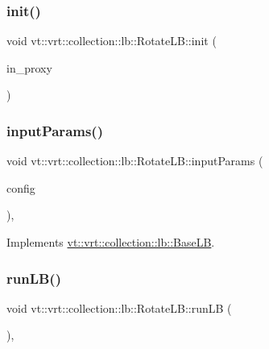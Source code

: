 \subsubsection{\texorpdfstring{init()}{init()}}
{\footnotesize\ttfamily void vt\+::vrt\+::collection\+::lb\+::\+Rotate\+L\+B\+::init (\begin{DoxyParamCaption}\item[{\hyperlink{structvt_1_1objgroup_1_1proxy_1_1_proxy}{objgroup\+::proxy\+::\+Proxy}$<$ \hyperlink{structvt_1_1vrt_1_1collection_1_1lb_1_1_rotate_l_b}{Rotate\+LB} $>$}]{in\+\_\+proxy }\end{DoxyParamCaption})}

\mbox{\label{structvt_1_1vrt_1_1collection_1_1lb_1_1_rotate_l_b_a39b5c8882b32f8a50be30cf2f3fd8fab}} 
\subsubsection{\texorpdfstring{input\+Params()}{inputParams()}}
{\footnotesize\ttfamily void vt\+::vrt\+::collection\+::lb\+::\+Rotate\+L\+B\+::input\+Params (\begin{DoxyParamCaption}\item[{\hyperlink{structvt_1_1vrt_1_1collection_1_1balance_1_1_config_entry}{balance\+::\+Config\+Entry} $\ast$}]{config }\end{DoxyParamCaption})\hspace{0.3cm}{\ttfamily [override]}, {\ttfamily [virtual]}}



Implements \hyperlink{structvt_1_1vrt_1_1collection_1_1lb_1_1_base_l_b_acf56a0cc29f5e00c0dccf2003baa2f43}{vt\+::vrt\+::collection\+::lb\+::\+Base\+LB}.

\mbox{\label{structvt_1_1vrt_1_1collection_1_1lb_1_1_rotate_l_b_af54a83925b1bbe05052c475523110e98}} 
\subsubsection{\texorpdfstring{run\+L\+B()}{runLB()}}
{\footnotesize\ttfamily void vt\+::vrt\+::collection\+::lb\+::\+Rotate\+L\+B\+::run\+LB (\begin{DoxyParamCaption}\item[{\hyperlink{namespacevt_a876a9d0cd5a952859c72de8a46881442}{Time\+Type}}]{ }\end{DoxyParamCaption})\hspace{0.3cm}{\ttfamily [override]}, {\ttfamily [virtual]}}



